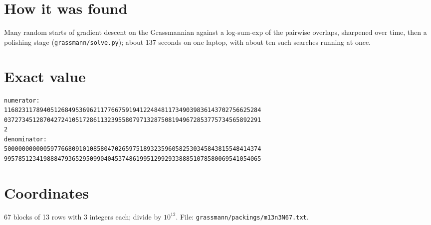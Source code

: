 \documentclass[11pt,a4paper]{article}
\begin{document}
\section{How it was found}
Many random starts of gradient descent on the Grassmannian against a log-sum-exp of the pairwise overlaps, sharpened over time, then a polishing stage (\texttt{grassmann/solve.py}); about 137 seconds on one laptop, with about ten such searches running at once.


\appendix
\section{Exact value}
{\small
\begin{verbatim}
numerator:
116823117894051268495369621177667591941224848117349039836143702756625284
037273451287042724105172861132395580797132875081949672853775734565892291
2
denominator:
500000000000597766809101085804702659751893235960582530345843815548414374
995785123419888479365295099040453748619951299293388851078580069541054065
\end{verbatim}}

\section{Coordinates}
67 blocks of 13 rows with 3 integers each; divide by $10^{12}$. File: \texttt{grassmann/packings/m13n3N67.txt}.
{\tiny
\begin{multicols}{3}
\end{multicols}}
\end{document}
